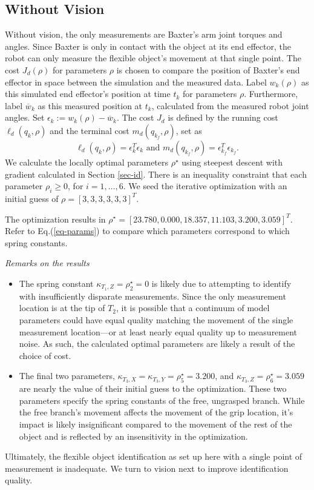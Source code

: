 \documentclass[runningheads,a4paper]{llncs}
\begin{document}
\subsection{Without Vision \label{sec-no_vis}}
Without vision, the only measurements are Baxter's arm joint torques and angles.  Since Baxter is only in contact with the object at its end effector, the robot can only measure the flexible object's movement at that single point. The cost $J_d(\rho)$ for parameters $\rho$ is chosen to compare the position of Baxter's end effector in space between the simulation and the measured data.  Label $w_k(\rho)$ as this simulated end effector's position at time $t_k$ for parameters $\rho$. Furthermore, label $\overline{w}_k$ as this measured position at $t_k$, calculated from the measured robot joint angles.  Set $\epsilon_k := w_k(\rho)-\overline{w}_k$.  The cost $J_d$ is defined by the running cost $\ell_d(q_k,\rho)$ and the terminal cost $m_d(q_{k_f},\rho)$, set as
\[
\ell_d(q_k,\rho) = \epsilon_k^T\epsilon_k \textrm{ and } m_d(q_{k_f},\rho) = \epsilon_{k_f}^T\epsilon_{k_f}.
\]
We calculate the locally optimal parameters $\rho^\star$ using steepest descent with gradient calculated in Section \ref{sec-id}. There is an inequality constraint that each parameter $\rho_i\geq 0$, for $i = 1,\ldots,6$. We seed the iterative optimization with an initial guess of $\rho = [3, 3, 3, 3, 3, 3]^T$.  %

The optimization results in $\rho^\star = [23.780,  0.000 , 18.357 , 11.103 , 3.200,  3.059]^T$. Refer to Eq.(\ref{eq-params}) to compare which parameters correspond to which spring constants. 

\emph{Remarks on the results}
\begin{itemize}
\item The spring constant $\kappa_{T_1,Z} = \rho^\star_2 = 0$ is likely due to attempting to identify with insufficiently disparate measurements. Since the only measurement location is at the tip of $T_2$, it is possible that a continuum of model parameters could have equal quality matching the movement of the single measurement location---or at least nearly equal quality up to measurement noise. As such, the calculated optimal parameters are likely a result of the choice of cost.
\item The final two parameters, $\kappa_{T_3,X} = \kappa_{T_3,Y} = \rho^\star_5 = 3.200$, and $\kappa_{T_3,Z} = \rho^\star_6 = 3.059$ are nearly the value of their initial guess to the optimization. These two parameters specify the spring constants of the free, ungrasped branch. While the free branch's movement affects the movement of the grip location, it's impact is likely insignificant compared to the movement of the rest of the object and is reflected by an insensitivity in the optimization.
\end{itemize}
Ultimately, the flexible object identification as set up here with a single point of measurement is inadequate. We turn to vision next to improve identification quality.
\end{document}
